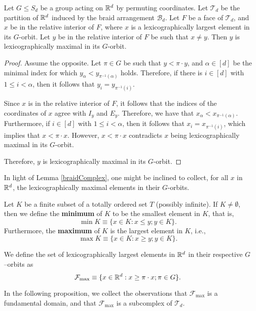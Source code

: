 \begin{lem}\label{braidComplex}
Let $G \le S_d$ be a group acting on $\mathbb{R}^d$ by permuting coordinates. Let $\mathcal{T}_d$ be the partition of $\mathbb{R}^d$ induced by the braid arrangement $\mathcal{B}_d$. Let $F$ be a face of $\mathcal{T}_d$, and $x$ be in the relative interior of $F$, where $x$ is a lexicographically largest element in its $G$-orbit. Let $y$ be in the relative interior of  $F$ be such that $x \neq y$. Then $y$ is lexicographically maximal in its $G$-orbit.
\end{lem}

\begin{proof}
Assume the opposite. Let $\pi \in G$ be such that $y < \pi \cdot y$, and $\alpha\in[d]$ be the minimal index for which $y_\alpha < y_{\pi^{-1}(\alpha)}$ holds. Therefore, if there is $i\in[d]$ with $1 \le i < \alpha$, then it follows that $y_i = y_{\pi^{-1}(i)}$.

Since $x$ is in the relative interior of $F$, it follows that the indices of the coordinates of $x$ agree with $I_y$ and $E_y$. Therefore, we have that $x_\alpha < x_{\pi^{-1}(\alpha)}$. Furthermore, if $i\in[d]$ with $1 \le i < \alpha$, then it follows that $x_i = x_{\pi^{-1}(i)}$, which implies that $x < \pi \cdot x$. However, $x < \pi \cdot x$ contradicts $x$ being lexicographically maximal in its $G$-orbit.

Therefore, $y$ is lexicographically maximal in its $G$-orbit.
\end{proof}

In light of Lemma \ref{braidComplex}, one might be inclined to collect, for all $x$ in $\mathbb{R}^d$, the lexicographically maximal elements in their $G$-orbits.

\begin{defn}
Let $K$ be a finite subset of a totally ordered set $T$ (possibly infinite). If $K \neq \emptyset$, then we define the \textbf{minimum} of $K$ to be the smallest element in $K$, that is, \[\min K \equiv \{x \in K : x \le y; y \in K\}.\] Furthermore, the \textbf{maximum} of $K$ is the largest element in $K$, i.e., \[\max K \equiv \{x \in K : x \ge y; y \in K\}.\]
\end{defn}


We define the set of lexicographically largest elements in $\mathbb{R}^d$ in their respective $G$--orbits as \[\mathcal{F}_{\max} \equiv \{x \in \mathbb{R}^d : x \ge \pi \cdot x ; \pi \in G\}.\]

In the following proposition, we collect the observations that $\mathcal{F}_{\max}$ is a fundamental domain, and that $\mathcal{F}_{\max}$ is a subcomplex of $\mathcal{T}_d$.

